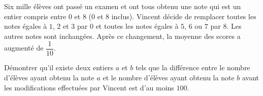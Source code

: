 Six mille élèves ont passé un examen et ont tous obtenu une note qui est un entier compris entre $0$ et $8$ ($0$ et $8$ inclus). Vincent décide de remplacer toutes les notes égales à $1$, $2$ et $3$ par $0$ et toutes les notes égales à $5$, $6$ ou $7$ par $8$. Les autres notes sont inchangées. Après ce changement, la moyenne des scores a augmenté de $\dfrac 1{10}$.

Démontrer qu'il existe deux entiers $a$ et $b$ tels que la différence entre le nombre d'élèves ayant obtenu la note $a$ et le nombre d'élèves ayant obtenu la note $b$ avant les modifications effectuées par Vincent est d'au moins $100$.